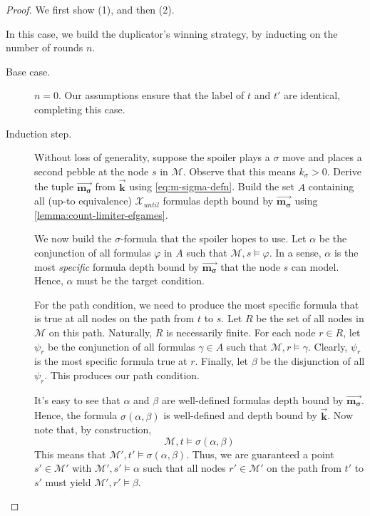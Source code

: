 \documentclass[a4paper,UKenglish,cleveref, autoref, thm-restate, numberwithinsect]{lipics-v2021}
\newcommand{\myvec}[1]{\overrightarrow{\mathbf{#1}}}
\begin{document}
\begin{proof}
    We first show (1), and then (2).

     In this case, we build the duplicator's winning strategy, by inducting on the number of rounds $n$.

    \begin{description}
        \item[Base case.] $n = 0$. Our assumptions ensure that the label of $t$ and $t'$ are identical, completing this case.
        \item[Induction step.]
            Without loss of generality, suppose the spoiler plays a $\sigma$ move and places a second pebble at the node $s$ in $\mathcal{M}$. Observe that this means $k_\sigma > 0$. Derive the tuple $\myvec{m_\sigma}$ from $\myvec{k}$ using \eqref{eq:m-sigma-defn}. Build the set $A$ containing all (up-to equivalence) $\mathcal{X}_{until}$ formulas depth bound by $\myvec{m_\sigma}$ using \cref{lemma:count-limiter-efgames}.

            We now build the $\sigma$-formula that the spoiler hopes to use. Let $\alpha$ be the conjunction of all formulas $\varphi$ in $A$ such that $\mathcal{M}, s \vDash \varphi$. In a sense, $\alpha$ is the most \textit{specific} formula depth bound by $\myvec{m_\sigma}$ that the node $s$ can model. Hence, $\alpha$ must be the target condition.

            For the path condition, we need to produce the most specific formula that is true at all nodes on the path from $t$ to $s$. Let $R$ be the set of all nodes in $\mathcal{M}$ on this path. Naturally, $R$ is necessarily finite. For each node $r \in R$, let $\psi_r$ be the conjunction of all formulas $\gamma \in A$ such that $\mathcal{M}, r \vDash \gamma$. Clearly, $\psi_r$ is the most specific formula true at $r$. Finally, let $\beta$ be the disjunction of all $\psi_r$. This produces our path condition.

            It's easy to see that $\alpha$ and $\beta$ are well-defined formulas depth bound by $\myvec{m_\sigma}$. Hence, the formula $\sigma(\alpha, \beta)$ is well-defined and depth bound by $\myvec{k}$. Now note that, by construction,
            \begin{equation*}
                \mathcal{M}, t \vDash \sigma(\alpha, \beta)
            \end{equation*}
            This means that $\mathcal{M}', t' \vDash \sigma(\alpha, \beta)$. Thus, we are guaranteed a point $s' \in \mathcal{M}'$ with $\mathcal{M}', s' \vDash \alpha$ such that all nodes $r' \in \mathcal{M}'$ on the path from $t'$ to $s'$ must yield $\mathcal{M}', r' \vDash \beta$.


\end{description}
\end{proof}
\end{document}
